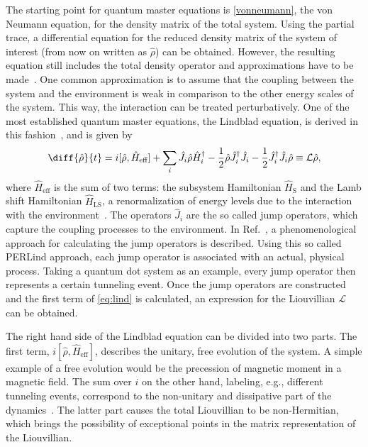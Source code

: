 \documentclass[../main.tex]{subfiles}
\begin{document}
The starting point for quantum master equations is \cref{vonneumann}, the von Neumann equation, for the density matrix of the total system. Using the partial trace, a differential equation for the reduced density matrix of the system of interest (from now on written as $\hat\rho$) can be obtained. However, the resulting equation still includes the total density operator and approximations have to be made~\cite{lindblad}. One common approximation is to assume that the coupling between the system and the environment is weak in comparison to the other energy scales of the system. This way, the interaction can be treated perturbatively. One of the most established quantum master equations, the Lindblad equation, is derived in this fashion~\cite{lindorigin}, and is given by
\begin{equation}\label{eq:lind}
    \diff{\hat\rho}{t} = i[\hat\rho, \hat H_\text{eff}] + \sum_i \hat J_i\hat\rho\hat H_i^\dag - \frac{1}{2}\hat\rho\hat J_i^\dag\hat J_i - \frac{1}{2}\hat J_i^\dag\hat J_i \hat\rho \equiv \mathcal{L}\hat\rho,
\end{equation}
where $\hat H_\text{eff}$ is the sum of two terms: the subsystem Hamiltonian $\hat H_\text{S}$ and the Lamb shift Hamiltonian $\hat H_\text{LS}$, a renormalization of energy levels due to the interaction with the environment~\cite{lindblad}. The operators $\hat J_i$ are the so called jump operators, which capture the coupling processes to the environment. In Ref.~\cite{perlind}, a phenomenological approach for calculating the jump operators is described. Using this so called PERLind approach, each jump operator is associated with an actual, physical process. Taking a quantum dot system as an example, every jump operator then represents a certain tunneling event. Once the jump operators are constructed and the first term of \cref{eq:lind} is calculated, an expression for the Liouvillian $\mathcal{L}$ can be obtained. 

The right hand side of the Lindblad equation can be divided into two parts. The first term, $i[\hat\rho, \hat H_\text{eff}]$, describes the unitary, free evolution of the system. A simple example of a free evolution would be the precession of magnetic moment in a magnetic field. The sum over $i$ on the other hand, labeling, e.g., different tunneling events, correspond to the non-unitary and dissipative part of the dynamics~\cite{bookopen}. The latter part causes the total Liouvillian to be non-Hermitian, which brings the possibility of exceptional points in the matrix representation of the Liouvillian.
\end{document}
